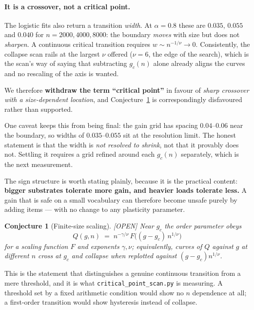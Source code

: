 \documentclass[11pt]{article}
\theoremstyle{definition}
\theoremstyle{plain}
\newtheorem{conjecture}[lemma]{Conjecture}
\newcommand{\OPEN}{\textnormal{\footnotesize\textsf{[OPEN]}}}
\begin{document}
\paragraph{It is a crossover, not a critical point.} The logistic fits also
return a transition \emph{width}. At $\alpha=0.8$ these are $0.035$, $0.055$
and $0.040$ for $n = 2000, 4000, 8000$: the boundary \emph{moves} with size but
does not \emph{sharpen}. A continuous critical transition requires
$w \sim n^{-1/\nu} \to 0$. Consistently, the collapse scan rails at the largest
$\nu$ offered ($\nu = 6$, the edge of the search), which is the scan's way of
saying that subtracting $g_c(n)$ alone already aligns the curves and no
rescaling of the axis is wanted.

We therefore \textbf{withdraw the term ``critical point''} in favour of
\emph{sharp crossover with a size-dependent location}, and
Conjecture~\ref{conj:fss} is correspondingly disfavoured rather than supported.

One caveat keeps this from being final: the gain grid has spacing $0.04$--$0.06$
near the boundary, so widths of $0.035$--$0.055$ sit at the resolution limit.
The honest statement is that the width is \emph{not resolved to shrink}, not
that it provably does not. Settling it requires a grid refined around each
$g_c(n)$ separately, which is the next measurement.

The sign structure is worth stating plainly, because it is the practical
content: \textbf{bigger substrates tolerate more gain, and heavier loads
tolerate less.} A gain that is safe on a small vocabulary can therefore become
unsafe purely by adding items --- with no change to any plasticity parameter.

\begin{conjecture}[Finite-size scaling]\label{conj:fss} \OPEN
Near $g_c$ the order parameter obeys
\[
  Q(g,n) \;=\; n^{-\gamma/\nu}\, F\!\big((g-g_c)\, n^{1/\nu}\big)
\]
for a scaling function $F$ and exponents $\gamma,\nu$; equivalently, curves of
$Q$ against $g$ at different $n$ cross at $g_c$ and collapse when replotted
against $(g-g_c)n^{1/\nu}$.
\end{conjecture}

This is the statement that distinguishes a genuine continuous transition from a
mere threshold, and it is what \texttt{critical\_point\_scan.py} is measuring.
A threshold set by a fixed arithmetic condition would show no $n$ dependence at
all; a first-order transition would show hysteresis instead of collapse.
\end{document}
